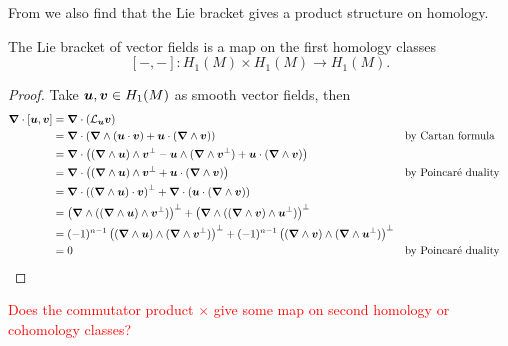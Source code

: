 \documentclass{article}
\begin{document}
From \cite{delphenich_axioms_2005} we also find that the Lie bracket gives a product structure on homology.
\begin{theorem}
The Lie bracket of vector fields is a map on the first homology classes
\[
[-,-] \colon H_1(M) \times H_1(M) \to H_1(M).
\]
\end{theorem}
\begin{proof}
Take $\boldsymbol{u}, \boldsymbol{v} \in H_1(M)$ as smooth vector fields, then 
\begin{align}
\boldsymbol{\nabla} \cdot [\boldsymbol{u},\boldsymbol{v}] &= \boldsymbol{\nabla} \cdot (\mathcal{L}_{\boldsymbol{u}} \boldsymbol{v})\\
&= \boldsymbol{\nabla} \cdot (\boldsymbol{\nabla} \wedge (\boldsymbol{u}\cdot \boldsymbol{v}) + \boldsymbol{u}\cdot (\boldsymbol{\nabla} \wedge \boldsymbol{v})) &&\textrm{by Cartan formula}\\
&= \boldsymbol{\nabla} \cdot \left( (\boldsymbol{\nabla} \wedge \boldsymbol{u})\wedge \boldsymbol{v}^\perp - \boldsymbol{u} \wedge (\boldsymbol{\nabla} \wedge \boldsymbol{v}^\perp) + \boldsymbol{u} \cdot (\boldsymbol{\nabla} \wedge \boldsymbol{v})\right)\\
&= \boldsymbol{\nabla} \cdot \left( (\boldsymbol{\nabla} \wedge \boldsymbol{u}) \wedge \boldsymbol{v}^\perp + \boldsymbol{u}\cdot (\boldsymbol{\nabla} \wedge \boldsymbol{v})\right) && \textrm{by Poincar\'e duality}\\
&= \boldsymbol{\nabla} \cdot \left( (\boldsymbol{\nabla} \wedge \boldsymbol{u}) \cdot \boldsymbol{v}\right)^\perp  + \boldsymbol{\nabla} \cdot \left( \boldsymbol{u} \cdot (\boldsymbol{\nabla} \wedge \boldsymbol{v} ) \right)\\
&= \left( \boldsymbol{\nabla} \wedge ((\boldsymbol{\nabla} \wedge \boldsymbol{u})\wedge \boldsymbol{v}^\perp)\right)^\perp +\left( \boldsymbol{\nabla} \wedge ((\boldsymbol{\nabla} \wedge \boldsymbol{v}) \wedge \boldsymbol{u}^\perp)\right)^\perp \\
&= (-1)^{n-1}\left( (\boldsymbol{\nabla} \wedge \boldsymbol{u})\wedge (\boldsymbol{\nabla} \wedge \boldsymbol{v}^\perp)\right)^\perp + (-1)^{n-1} \left( (\boldsymbol{\nabla} \wedge \boldsymbol{v}) \wedge (\boldsymbol{\nabla} \wedge \boldsymbol{u}^\perp)\right)^\perp\\
&= 0 && \textrm{by Poincar\'e duality}
\end{align}
\end{proof}

\begin{proposition}
\textcolor{red}{Does the commutator product $\times$ give some map on second homology or cohomology classes?}
\end{proposition}


\end{document}
